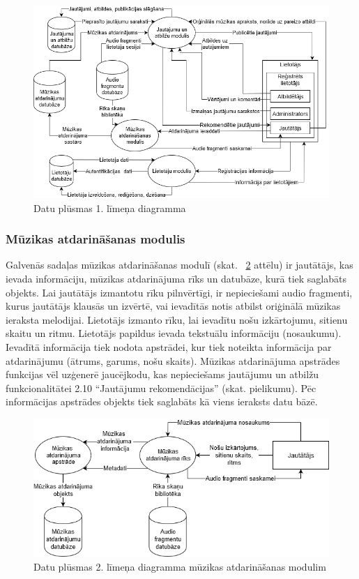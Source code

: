 \documentclass[12pt]{article}
\begin{document}
\begin{figure}[H]
\begin{center}
	\includegraphics[scale=0.5]{DPD1.png}
	\caption{Datu plūsmas 1. līmeņa diagramma}
	\label{fig:dpd_1}
\end{center}
\end{figure}

\subsubsection{Mūzikas atdarināšanas modulis}

Galvenās sadaļas mūzikas atdarināšanas modulī (skat. ~\ref{fig:dpd_2_1} attēlu) ir jautātājs, kas ievada informāciju, mūzikas atdarinājuma rīks un datubāze, kurā tiek saglabāts objekts. Lai jautātājs izmantotu rīku pilnvērtīgi, ir nepieciešami audio fragmenti, kurus jautātājs klausās un izvērtē, vai ievadītās notis atbilst oriģinālā mūzikas ieraksta melodijai. Lietotājs izmanto rīku, lai ievadītu nošu izkārtojumu, sitienu skaitu un ritmu. Lietotājs papildus ievada tekstuālu informāciju (nosaukumu). Ievadītā informācija tiek nodota apstrādei, kur tiek noteikta informācija par atdarinājumu (ātrums, garums, nošu skaits). Mūzikas atdarinājuma apstrādes funkcijas vēl uzģenerē jaucējkodu, kas nepieciešams jautājumu un atbilžu funkcionalitātei 2.10 ``Jautājumu rekomendācijas'' (skat. pielikumu). Pēc informācijas apstrādes objekts tiek saglabāts kā viens ieraksts datu bāzē.

\begin{figure}[H]
\begin{center}
	\includegraphics[scale=0.5]{DPD2_1.png}
	\caption{Datu plūsmas 2. līmeņa diagramma mūzikas atdarināšanas modulim}
	\label{fig:dpd_2_1}
\end{center}
\end{figure}
\end{document}
